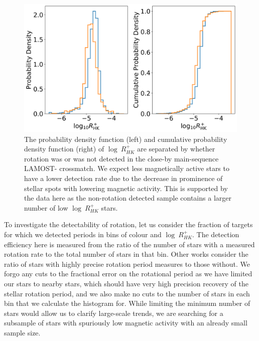 \begin{figure}
\centering
  \includegraphics[width=\textwidth]{Figures/rot_gap_figures/pdf_cdf.png}
  \caption[The probability density function (left) and cumulative probability density function (right) of $\log \ R^{+}_{HK}$ are separated by whether rotation was or was not detected in the close-by main-sequence LAMOST-\kepler{} crossmatch.]{
  	The probability density function (left) and cumulative probability density function (right) of $\log \ R^{+}_{HK}$ are separated by whether rotation was or was not detected in the close-by main-sequence LAMOST-\kepler{} crossmatch. 
	We expect less magnetically active stars to have a lower detection rate due to the decrease in prominence of stellar spots with lowering magnetic activity.
 This is supported by the data here as the non-rotation detected sample contains a larger number of low $\log \ R^{+}_{HK}$ stars.}
  \label{fig:pdf_cdf}
\end{figure}

To investigate the detectability of rotation, let us consider the fraction of targets for which we detected periods in bins of colour and $\log \ R^{+}_{HK}$.
The detection efficiency here is measured from the ratio of the number of stars with a measured rotation rate to the total number of stars in that bin.
Other works \citep[see, e.g.,][]{claytor_tess_2023} consider the ratio of stars with highly precise rotation period measures to those without.
We forgo any cuts to the fractional error on the rotational period as we have limited our stars to nearby stars, which should have very high precision recovery of the stellar rotation period, and we also make no cuts to the number of stars in each bin that we calculate the histogram for. 
While limiting the minimum number of stars would allow us to clarify large-scale trends, we are searching for a subsample of stars with spuriously low magnetic activity with an already small sample size.

